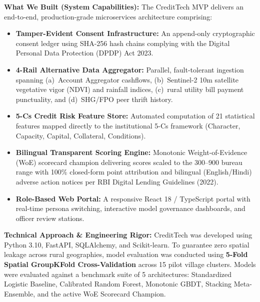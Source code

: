 \documentclass[11pt,a4paper,oneside]{report}
\begin{document}
\vspace{0.3cm}
\noindent\textbf{What We Built (System Capabilities):} The CreditTech MVP delivers an end-to-end, production-grade microservices architecture comprising:
\begin{itemize}[leftmargin=1.5em, itemsep=2pt]
  \item \textbf{Tamper-Evident Consent Infrastructure:} An append-only cryptographic consent ledger using SHA-256 hash chains complying with the Digital Personal Data Protection (DPDP) Act 2023.
  \item \textbf{4-Rail Alternative Data Aggregator:} Parallel, fault-tolerant ingestion spanning (a)~Account Aggregator cashflows, (b)~Sentinel-2 10m satellite vegetative vigor (NDVI) and rainfall indices, (c)~rural utility bill payment punctuality, and (d)~SHG/FPO peer thrift history.
  \item \textbf{5-Cs Credit Risk Feature Store:} Automated computation of 21 statistical features mapped directly to the institutional 5-Cs framework (Character, Capacity, Capital, Collateral, Conditions).
  \item \textbf{Bilingual Transparent Scoring Engine:} Monotonic Weight-of-Evidence (WoE) scorecard champion delivering scores scaled to the 300--900 bureau range with 100\% closed-form point attribution and bilingual (English/Hindi) adverse action notices per RBI Digital Lending Guidelines (2022).
  \item \textbf{Role-Based Web Portal:} A responsive React 18 / TypeScript portal with real-time persona switching, interactive model governance dashboards, and officer review stations.
\end{itemize}

\vspace{0.3cm}
\noindent\textbf{Technical Approach \& Engineering Rigor:} CreditTech was developed using Python 3.10, FastAPI, SQLAlchemy, and Scikit-learn. To guarantee zero spatial leakage across rural geographies, model evaluation was conducted using \textbf{5-Fold Spatial GroupKFold Cross-Validation} across 15 pilot village clusters. Models were evaluated against a benchmark suite of 5 architectures: Standardized Logistic Baseline, Calibrated Random Forest, Monotonic GBDT, Stacking Meta-Ensemble, and the active WoE Scorecard Champion. 
\end{document}
